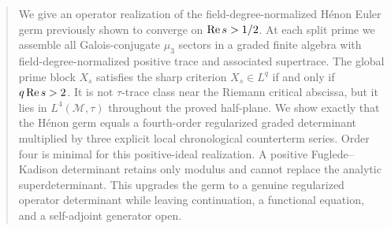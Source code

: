 \begin{abstract}
We give an operator realization of the field-degree-normalized H\'enon Euler
germ previously shown to converge on $\RePart s>1/2$.  At each split prime we
assemble all Galois-conjugate $\mu_3$ sectors in a graded finite algebra with
field-degree-normalized positive trace and associated supertrace.  The global
prime block $X_s$ satisfies the sharp criterion $X_s\in L^q$ if and only if
$q\RePart s>2$.  It is not $\tau$-trace class near the Riemann critical
abscissa, but it lies in $L^4(\mathcal M,\tau)$ throughout the proved
half-plane.  We show exactly that the H\'enon germ equals a fourth-order
regularized graded determinant multiplied
by three explicit local chronological counterterm series.  Order four is
minimal for this positive-ideal realization.  A positive Fuglede--Kadison
determinant retains only modulus and cannot replace the analytic
superdeterminant.  This upgrades the germ to a genuine regularized operator
determinant while leaving continuation, a functional equation, and a
self-adjoint generator open.
\end{abstract}
